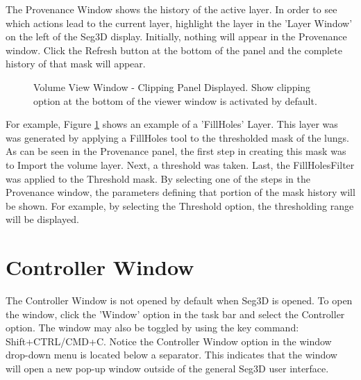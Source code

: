 \documentclass[fleqn,11pt,openany]{book}
\begin{document}
The Provenance Window shows the history of the active layer.  
In order to see which actions lead to the current layer, highlight the layer in the 'Layer Window' on the left of the Seg3D display.
Initially, nothing will appear in the Provenance window.
Click the Refresh button at the bottom of the panel and the complete history of that mask will appear.

\begin{figure}[b!]
\caption{Volume View Window - Clipping Panel Displayed. Show clipping option at the bottom of the viewer window is activated by default.}\label{fig:ProvenanceWindow}
\end{figure}

For example, Figure \ref{fig:ProvenanceWindow} shows an example of a 'FillHoles' Layer.
This layer was was generated by applying a FillHoles tool to the thresholded mask of the lungs.
As can be seen in the Provenance panel, the first step in creating this mask was to Import the volume layer.  
Next, a threshold was taken.  Last, the FillHolesFilter was applied to the Threshold mask.
By selecting one of the steps in the Provenance window, the parameters defining that portion of the mask history will be shown.
For example, by selecting the Threshold option, the thresholding range will be displayed.

\section{Controller Window}
The Controller Window is not opened by default when Seg3D is opened.  To open the window, click the 'Window' option in the task bar and select the Controller option.  The window may also be toggled by using the key command: Shift+CTRL/CMD+C.
Notice the Controller Window option in the window drop-down menu is located below a separator.  
This indicates that the window will open a new pop-up window outside of the general Seg3D user interface.
\end{document}
